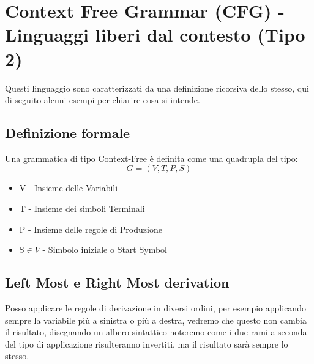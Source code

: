 \section{Context Free Grammar (CFG) - Linguaggi liberi dal contesto (Tipo 2)}
Questi linguaggio sono caratterizzati da una definizione ricorsiva dello stesso, qui di
seguito alcuni esempi per chiarire cosa si intende.

\subsection{Definizione formale}
Una grammatica di tipo Context-Free è definita come una quadrupla del tipo:
\begin{equation*}
    G = (V, T, P, S)
\end{equation*}
\begin{itemize}
    \item V - Insieme delle Variabili
    \item T - Insieme dei simboli Terminali
    \item P - Insieme delle regole di Produzione
    \item S$\in V$ - Simbolo iniziale o Start Symbol
\end{itemize}
\subsection*{Left Most e Right Most derivation}
Posso applicare le regole di derivazione in diversi ordini, per esempio applicando sempre la variabile più
a sinistra o più a destra, vedremo che questo non cambia il risultato, disegnando un albero sintattico noteremo
come i due rami a seconda del tipo di applicazione risulteranno invertiti, ma il risultato sarà sempre lo stesso.

